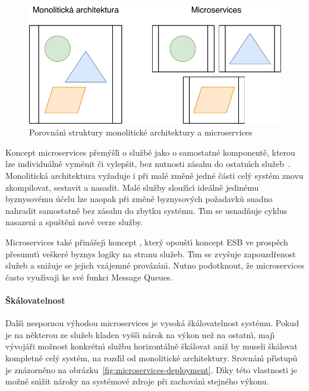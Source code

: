 \begin{figure}
    \centering
    \includegraphics[keepaspectratio=true, width=0.5\linewidth]{figures/monolith-vs-microservices.pdf}
    \caption{Porovnán\'{\i} struktury monolitické architektury a microservices~\cite{lewis2014microservices}}
    \label{fig:monolith-vs-microservices}
\end{figure}

Koncept microservices přem\'yšl\'{\i} o službě jako o samostatné komponentě,
kterou lze individuálně vyměnit či vylepšit, bez nutnosti zásahu do
ostatn\'{\i}ch služeb~\cite{lewis2014microservices}. Monolitická architektura
vyžaduje i při malé změně jedné části cel\'y systém znovu zkompilovat, sestavit
a nasadit. Malé služby slouž\'{\i}c\'{\i} ideálně jedinému byznysovému účelu lze naopak
při změně byznysov\'ych požadavků snadno nahradit samostatně bez zásahu do zbytku
systému. T\'{\i}m se usnadňuje cyklus nasazen\'{\i} a spuštěn\'{\i} nové verze služby.

Microservices také přinášej\'{\i} koncept ,
kter\'y opoušt\'{\i} koncept \gls{ESB} ve prospěch přesunut\'{\i} veškeré byznys logiky
na stranu služeb. T\'{\i}m se zvyšuje zapouzdřenost služeb a snižuje se
jejich vzájemné provázán\'{\i}. Nutno podotknout, že microservices často
využ\'{\i}vaj\'{\i} ke své funkci Message Queues.

\paragraph{Škálovatelnost}
Dalš\'{\i} nespornou v\'yhodou microservices je vysoká škálovatelnost systému. Pokud je na
některou ze služeb kladen vyšš\'{\i} nárok na v\'ykon než na ostatn\'{\i}, maj\'{\i}
v\'yvojáři možnost konkrétn\'{\i} službu horizontálně škálovat aniž by
museli škálovat kompletně cel\'y systém, na rozd\'{\i}l od monolitické architektury.
Srovnán\'{\i} př\'{\i}stupů je znázorněno na obrázku~\ref{fig:microservices-deployment}.
D\'{\i}ky této vlastnosti je možné sn\'{\i}žit nároky na systémové zdroje při zachován\'{\i}
stejného v\'ykonu.

